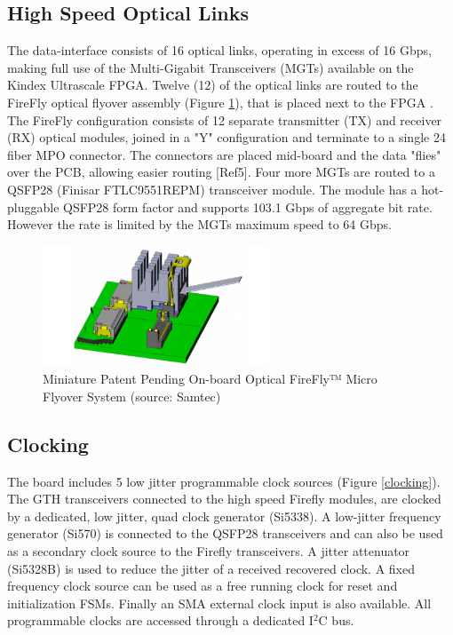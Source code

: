\documentclass[a4paper]{PoS}
\begin{document}
\subsection{High Speed Optical Links}
The data-interface consists of 16 optical links, operating in excess of 16 Gbps, making full use of the Multi-Gigabit Transceivers (MGTs) available on the Kindex Ultrascale FPGA. Twelve (12) of the optical links are routed to the FireFly optical flyover assembly (Figure \ref{firefly}), that is placed next to the FPGA \cite{zbinden2018connector}. The FireFly configuration consists of 12 separate transmitter (TX) and receiver (RX) optical modules, joined in a "Y" configuration and terminate to a single 24 fiber MPO connector. The connectors are placed mid-board and the data "flies" over the PCB, allowing easier routing [Ref5]. Four more MGTs are routed to a QSFP28 (Finisar FTLC9551REPM) transceiver module. The module has a hot-pluggable QSFP28 form factor and supports 103.1 Gbps of aggregate bit rate. However the rate is limited by the MGTs maximum speed to 64 Gbps.

\begin{figure}
\centering
\includegraphics[width=0.6\textwidth]{firefly.png}
\caption{Miniature Patent Pending On-board Optical FireFly™ Micro
Flyover System (source: Samtec) }
\label{firefly}
\end{figure}


\subsection{Clocking}
The board includes 5 low jitter programmable clock sources (Figure \ref{clocking}). The GTH transceivers connected to the high speed Firefly modules, are clocked by a dedicated, low jitter, quad clock generator (Si5338). A low-jitter frequency generator (Si570) is connected to the QSFP28 transceivers and can also be used as a secondary clock source to the Firefly transceivers. A jitter attenuator (Si5328B) is used to reduce the jitter of a received recovered clock. A fixed frequency clock source can be used as a free running clock for reset and initialization FSMs. Finally an SMA external clock input is also available. All programmable clocks are accessed through a dedicated I$^2$C bus.
\end{document}
